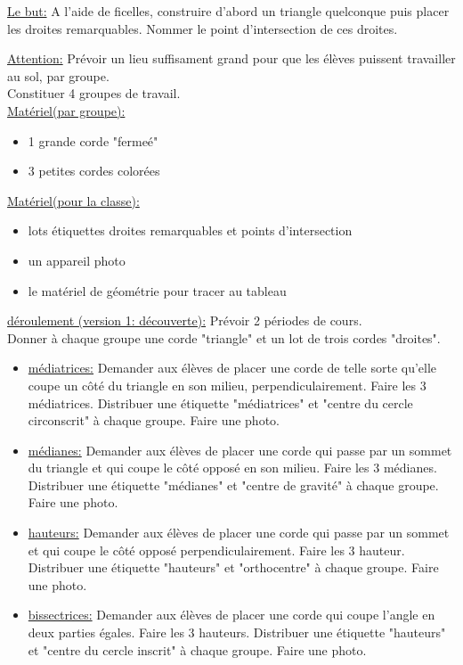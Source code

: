 \begin{activite}
\underline{Le but:} A l'aide de ficelles, construire d'abord un triangle quelconque puis placer les droites remarquables. Nommer le point d'intersection de ces droites.

\underline{Attention:} Prévoir un lieu suffisament grand pour que les élèves puissent travailler au sol, par groupe.\\

Constituer 4 groupes de travail.\\
\underline{Matériel(par groupe):}
\begin{itemize}
\item 1 grande corde "fermeé"
\item 3 petites cordes colorées
\end{itemize}
\underline{Matériel(pour la classe):}
\begin{itemize}
\item lots étiquettes droites remarquables et points d'intersection
\item un appareil photo
\item le matériel de géométrie pour tracer au tableau
\end{itemize}
\underline{déroulement (version 1: découverte):} Prévoir 2 périodes de cours.\\
Donner à chaque groupe une corde "triangle" et un lot de trois cordes  "droites".
\begin{itemize}
\item \underline{médiatrices:} Demander aux élèves de placer une corde de telle sorte qu'elle coupe un côté du triangle en son milieu, perpendiculairement. Faire les 3 médiatrices. Distribuer une étiquette "médiatrices" et "centre du cercle circonscrit" à chaque groupe. Faire une photo.
\item \underline{médianes:} Demander aux élèves de placer une corde qui passe par un sommet du triangle et qui coupe le côté opposé en son milieu. Faire les 3 médianes. Distribuer une étiquette "médianes" et "centre de gravité" à chaque groupe. Faire une photo.
\item \underline{hauteurs:} Demander aux élèves de placer une corde qui passe par un sommet et qui coupe le côté opposé perpendiculairement. Faire les 3 hauteur. Distribuer une étiquette "hauteurs" et "orthocentre" à chaque groupe. Faire une photo.
\item \underline{bissectrices:} Demander aux élèves de placer une corde qui coupe l'angle en deux parties égales. Faire les 3 hauteurs. Distribuer une étiquette "hauteurs" et "centre du cercle inscrit" à chaque groupe. Faire une photo.\\\\

\end{itemize}
\end{activite}
